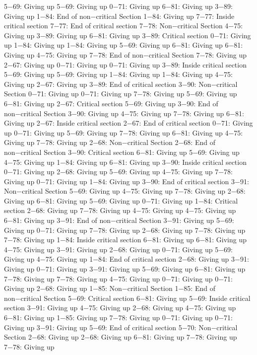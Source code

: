 5−69: Giving up
5−69: Giving up
0−71: Giving up
6−81: Giving up
3−89: Giving up
1−84: End of non−critical Section
1−84: Giving up
7−77: Inside critical section
7−77: End of critical section
7−78: Non−critical Section
4−75: Giving up
3−89: Giving up
6−81: Giving up
3−89: Critical section
0−71: Giving up
1−84: Giving up
1−84: Giving up
5−69: Giving up
6−81: Giving up
6−81: Giving up
4−75: Giving up
7−78: End of non−critical Section
7−78: Giving up
2−67: Giving up
0−71: Giving up
0−71: Giving up
3−89: Inside critical section
5−69: Giving up
5−69: Giving up
1−84: Giving up
1−84: Giving up
4−75: Giving up
2−67: Giving up
3−89: End of critical section
3−90: Non−critical Section
0−71: Giving up
0−71: Giving up
7−78: Giving up
5−69: Giving up
6−81: Giving up
2−67: Critical section
5−69: Giving up
3−90: End of non−critical Section
3−90: Giving up
4−75: Giving up
7−78: Giving up
6−81: Giving up
2−67: Inside critical section
2−67: End of critical section
0−71: Giving up
0−71: Giving up
5−69: Giving up
7−78: Giving up
6−81: Giving up
4−75: Giving up
7−78: Giving up
2−68: Non−critical Section
2−68: End of non−critical Section
3−90: Critical section
6−81: Giving up
5−69: Giving up
4−75: Giving up
1−84: Giving up
6−81: Giving up
3−90: Inside critical section
0−71: Giving up
2−68: Giving up
5−69: Giving up
4−75: Giving up
7−78: Giving up
0−71: Giving up
1−84: Giving up
3−90: End of critical section
3−91: Non−critical Section
5−69: Giving up
4−75: Giving up
7−78: Giving up
2−68: Giving up
6−81: Giving up
5−69: Giving up
0−71: Giving up
1−84: Critical section
2−68: Giving up
7−78: Giving up
4−75: Giving up
4−75: Giving up
6−81: Giving up
3−91: End of non−critical Section
3−91: Giving up
5−69: Giving up
0−71: Giving up
7−78: Giving up
2−68: Giving up
7−78: Giving up
7−78: Giving up
1−84: Inside critical section
6−81: Giving up
6−81: Giving up
4−75: Giving up
3−91: Giving up
2−68: Giving up
0−71: Giving up
5−69: Giving up
4−75: Giving up
1−84: End of critical section
2−68: Giving up
3−91: Giving up
0−71: Giving up
3−91: Giving up
5−69: Giving up
6−81: Giving up
7−78: Giving up
7−78: Giving up
4−75: Giving up
0−71: Giving up
0−71: Giving up
2−68: Giving up
1−85: Non−critical Section
1−85: End of non−critical Section
5−69: Critical section
6−81: Giving up
5−69: Inside critical section
3−91: Giving up
4−75: Giving up
2−68: Giving up
4−75: Giving up
6−81: Giving up
1−85: Giving up
7−78: Giving up
0−71: Giving up
0−71: Giving up
3−91: Giving up
5−69: End of critical section
5−70: Non−critical Section
2−68: Giving up
2−68: Giving up
6−81: Giving up
7−78: Giving up
7−78: Giving up
